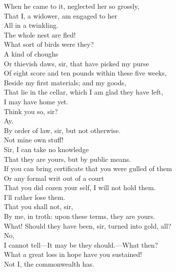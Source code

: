 \documentclass[a4paper,oneside,12pt]{memoir}
\begin{document}
\begin{drama*}
When he came to it, neglected her so grossly,\\
That I, a widower, am engaged to her\\
All in a twinkling.\\
\mammonspeaks {} The whole nest are fled!\\
\lovewitspeaks What sort of birds were they?\\
\mammonspeaks {} A kind of choughs\\
Or thievish daws, sir, that have picked my purse\\
Of eight score and ten pounds within these five weeks,\\
Beside my first materials; and my goods,\\
That lie in the cellar, which I am glad they have left,\\
I may have home yet.\\
\lovewitspeaks {} Think you so, sir?\\
\mammonspeaks {} Ay.\\
\lovewitspeaks By order of law, sir, but not otherwise.\\
\mammonspeaks Not mine own stuff!\\
\lovewitspeaks {} Sir, I can take no knowledge\\
That they are yours, but by public means.\\
If you can bring certificate that you were gulled of them\\
Or any formal writ out of a court\\
That you did cozen your self, I will not hold them.\\
\mammonspeaks I'll rather lose them.\\
\lovewitspeaks {} That you shall not, sir,\\
By me, in troth: upon these terms, they are yours.\\
What! Should they have been, sir, turned into gold, all?\\
\mammonspeaks No,\\
I cannot tell---It may be they should.---What then?\\
\lovewitspeaks What a great loss in hope have you sustained!\\
\mammonspeaks Not I, the commonwealth has.\\

\end{drama*}
\end{document}
